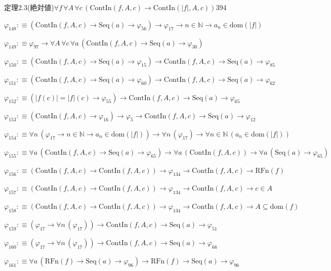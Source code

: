 \begin{fullproof}{定理2.3(絶対値)}{$\forall f\,\forall A\,\forall c\,(\mathrm{ContIn}(f,A,c) \to \mathrm{ContIn}(\lvert f \rvert,A,c))$}{394}
\begin{abbrevlist}
\item $\varphi_{148} :\equiv (\mathrm{ContIn}(f,A,c) \to \mathrm{Seq}(a) \to \varphi_{56}) \to \varphi_{17} \to n \in \mathbb{N} \to a_{n} \in \mathrm{dom}(\lvert f \rvert)$
\item $\varphi_{149} :\equiv \varphi_{97} \to \forall A\,\forall c\,\forall a\,(\mathrm{ContIn}(f,A,c) \to \mathrm{Seq}(a) \to \varphi_{30})$
\item $\varphi_{150} :\equiv (\mathrm{ContIn}(f,A,c) \to \mathrm{Seq}(a) \to \varphi_{15}) \to \mathrm{ContIn}(f,A,c) \to \mathrm{Seq}(a) \to \varphi_{85}$
\item $\varphi_{151} :\equiv (\mathrm{ContIn}(f,A,c) \to \mathrm{Seq}(a) \to \varphi_{60}) \to \mathrm{ContIn}(f,A,c) \to \mathrm{Seq}(a) \to \varphi_{62}$
\item $\varphi_{152} :\equiv (\lvert f(c) \rvert = \lvert f \rvert(c) \to \varphi_{55}) \to \mathrm{ContIn}(f,A,c) \to \mathrm{Seq}(a) \to \varphi_{65}$
\item $\varphi_{153} :\equiv (\mathrm{ContIn}(f,A,c) \to \varphi_{16}) \to \varphi_{5} \to \mathrm{ContIn}(f,A,c) \to \mathrm{Seq}(a) \to \varphi_{12}$
\item $\varphi_{154} :\equiv \forall n\,(\varphi_{17} \to n \in \mathbb{N} \to a_{n} \in \mathrm{dom}(\lvert f \rvert)) \to \forall n\,(\varphi_{17}) \to \forall n \in \mathbb{N}\,(a_{n} \in \mathrm{dom}(\lvert f \rvert))$
\item $\varphi_{155} :\equiv \forall a\,(\mathrm{ContIn}(f,A,c) \to \mathrm{Seq}(a) \to \varphi_{65}) \to \forall a\,(\mathrm{ContIn}(f,A,c)) \to \forall a\,(\mathrm{Seq}(a) \to \varphi_{65})$
\item $\varphi_{156} :\equiv (\mathrm{ContIn}(f,A,c) \to \mathrm{ContIn}(f,A,c)) \to \varphi_{134} \to \mathrm{ContIn}(f,A,c) \to \mathrm{RFn}(f)$
\item $\varphi_{157} :\equiv (\mathrm{ContIn}(f,A,c) \to \mathrm{ContIn}(f,A,c)) \to \varphi_{134} \to \mathrm{ContIn}(f,A,c) \to c \in A$
\item $\varphi_{158} :\equiv (\mathrm{ContIn}(f,A,c) \to \mathrm{ContIn}(f,A,c)) \to \varphi_{134} \to \mathrm{ContIn}(f,A,c) \to A \subseteq \mathrm{dom}(f)$
\item $\varphi_{159} :\equiv (\varphi_{17} \to \forall n\,(\varphi_{17})) \to \mathrm{ContIn}(f,A,c) \to \mathrm{Seq}(a) \to \varphi_{51}$
\item $\varphi_{160} :\equiv (\varphi_{17} \to \forall n\,(\varphi_{17})) \to \mathrm{ContIn}(f,A,c) \to \mathrm{Seq}(a) \to \varphi_{66}$
\item $\varphi_{161} :\equiv \forall a\,(\mathrm{RFn}(f) \to \mathrm{Seq}(a) \to \varphi_{96}) \to \mathrm{RFn}(f) \to \mathrm{Seq}(a) \to \varphi_{96}$

\end{abbrevlist}
\end{fullproof}
